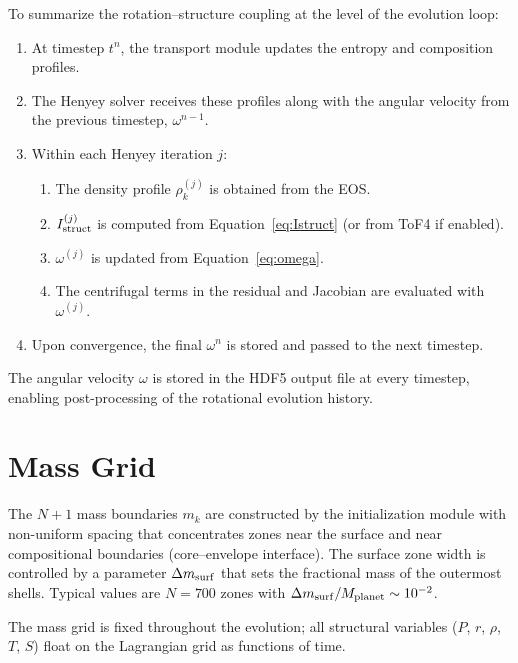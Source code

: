 \documentclass{aastex631}
\begin{document}
To summarize the rotation--structure coupling at the level of the
evolution loop:
\begin{enumerate}
  \item At timestep $t^n$, the transport module updates the entropy and
    composition profiles.
  \item The Henyey solver receives these profiles along with the
    angular velocity from the previous timestep, $\omega^{n-1}$.
  \item Within each Henyey iteration $j$:
  \begin{enumerate}
    \item The density profile $\rho_k^{(j)}$ is obtained from the EOS.
    \item $I_{\rm struct}^{(j)}$ is computed from
      Equation~\eqref{eq:Istruct} (or from ToF4 if enabled).
    \item $\omega^{(j)}$ is updated from Equation~\eqref{eq:omega}.
    \item The centrifugal terms in the residual and Jacobian are
      evaluated with $\omega^{(j)}$.
  \end{enumerate}
  \item Upon convergence, the final $\omega^n$ is stored and passed
    to the next timestep.
\end{enumerate}
The angular velocity $\omega$ is stored in the HDF5 output file at
every timestep, enabling post-processing of the rotational evolution
history.

\section{Mass Grid}\label{sec:grid}

The $N+1$ mass boundaries $m_k$ are constructed by the initialization
module with non-uniform spacing that concentrates zones near the surface
and near compositional boundaries (core--envelope interface).  The
surface zone width is controlled by a parameter $\Delta m_{\rm surf}$
that sets the fractional mass of the outermost shells.  Typical values
are $N = 700$ zones with $\Delta m_{\rm surf}/M_{\rm planet} \sim
10^{-2}$.

The mass grid is fixed throughout the evolution; all structural
variables ($P$, $r$, $\rho$, $T$, $S$) float on the Lagrangian
grid as functions of time.

\end{document}
